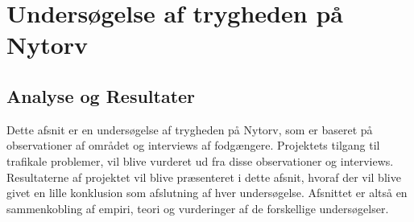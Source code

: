 \chapter{Undersøgelse af trygheden på Nytorv}
\label{chap:undersogelse_af_tryghed}
\section{Analyse og Resultater}
\label{sec:analyseogresult}
Dette afsnit er en undersøgelse af trygheden på Nytorv, som er baseret på observationer af området og interviews af fodgængere. Projektets tilgang til trafikale problemer, vil blive vurderet ud fra disse observationer og interviews. Resultaterne af projektet vil blive præsenteret i dette afsnit, hvoraf der vil blive givet en lille konklusion som afslutning af hver undersøgelse. Afsnittet er altså en sammenkobling af empiri, teori og vurderinger af de forskellige undersøgelser. 






